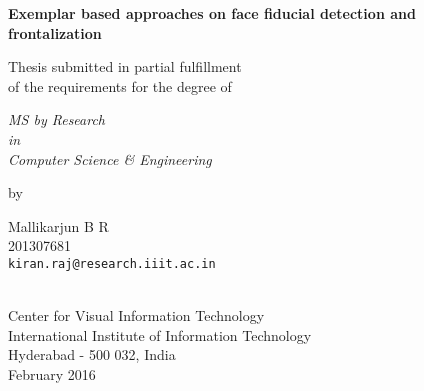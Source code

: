 \thispagestyle{empty}
\begin{center}
\vspace*{1.5cm}
{\Large \bf Exemplar based approaches on face fiducial detection and frontalization}

\vspace*{3.75cm}
{\large Thesis submitted in partial fulfillment\\}
{\large  of the requirements for the degree of \\}

\vspace*{1cm}
{\it {\large MS by Research} \\
{\large in\\}
{\large Computer Science \& Engineering \\}}

\vspace*{1cm}
{\large by}

\vspace*{5mm}
{\large Mallikarjun B R\\}
{\large 201307681\\
{\small \tt kiran.raj@research.iiit.ac.in}}


\vspace*{4.0cm}
{\\}
{\large Center for Visual Information Technology \\}
{\large International Institute of Information Technology\\}
{\large Hyderabad - 500 032, India\\}
{\large February 2016\\}
\end{center}
